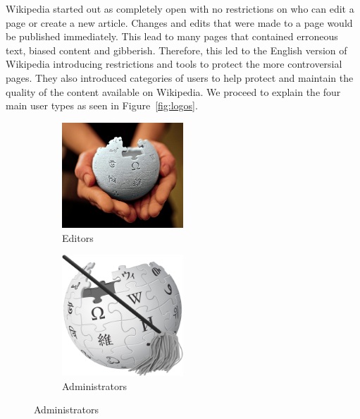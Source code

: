 Wikipedia started out as completely open with no restrictions on who can edit a page or create a new article. Changes and edits that were made to a page would be published immediately. This lead to many pages that contained erroneous text, biased content and gibberish. Therefore, this led to the English version of Wikipedia introducing restrictions and tools to protect the more controversial pages. They also introduced categories of users to help protect and maintain the quality of the content available on Wikipedia. We proceed to explain the four main user types as seen in Figure~\ref{fig:logos}. 
\begin{figure}[h!]
    \centering
    \begin{subfigure}[b]{0.49\textwidth}
        \centering
        \includegraphics[width=0.5\textwidth]{images/wikipedians.jpg}
        \caption{Editors}
        \label{fig:editors}
    \end{subfigure}
    \begin{subfigure}[b]{0.49\textwidth}
        \centering
        \includegraphics[width=0.5\textwidth]{images/admins.png}
        \caption{Administrators}
        \label{fig:admins}
    \end{subfigure}


\end{figure}
